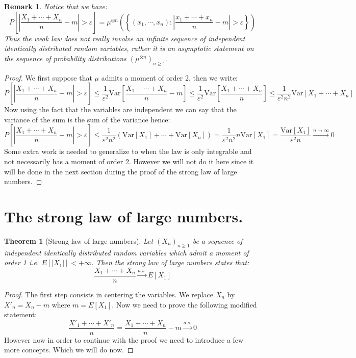 \documentclass[10pt,a4paper]{book}
\newtheorem{theorem}{Theorem}[section]
\newtheorem*{remark}{Remark}
\theoremstyle{definition}
\begin{document}
\begin{remark}
Notice that we have:
\[
P\left[ \left|\frac{X_1 + \cdots + X_n}{n} - m \right| > \varepsilon \right] = \mu^{\otimes n} \left( \left\{ \left( x_1, \cdots, x_n \right) : \left| \frac{x_1 + \cdots + x_n}{n} - m \right| > \varepsilon \right\} \right)
\]
Thus the weak law does not really involve an infinite sequence of independent identically distributed random variables, rather it is an asymptotic statement on the sequence of probability distributions $(\mu^{\otimes n})_{n \geq 1}$. 
\end{remark}

\begin{proof}

We first suppose that $\mu$ admits a moment of order 2, then we write:
\[
P\left[ \left|\frac{X_1 + \cdots + X_n}{n} - m \right| > \varepsilon \right] \leq \frac{1}{\varepsilon^2} \text{Var}\left[ \frac{X_1 + \cdots + X_n}{n} - m \right] \leq \frac{1}{\varepsilon^2} \text{Var}\left[ \frac{X_1 + \cdots + X_n}{n}\right] \leq \frac{1}{\varepsilon^2 n^2} \text{Var}\left[X_1 + \cdots + X_n \right]
\]
Now using the fact that the variables are independent we can say that the variance of the sum is the sum of the variance hence:
\[
P\left[ \left|\frac{X_1 + \cdots + X_n}{n} - m \right| > \varepsilon \right] \leq  \frac{1}{\varepsilon^2 n^2} (\text{Var}[X_1] + \cdots + \text{Var}[X_n]) = \frac{1}{\varepsilon^2 n^2} n \text{Var}[X_1] = \frac{\text{Var}[X_1]}{\varepsilon^2 n} \stackrel{n \to \infty}{\longrightarrow} 0
\]
Some extra work is needed to generalize to when the law is only integrable and not necessarily has a moment of order 2. However we will not do it here since it will be done in the next section during the proof of the strong law of large numbers.
\end{proof}

\section{The strong law of large numbers.}

\begin{theorem}[Strong law of large numbers]
Let $(X_n)_{n \geq 1}$ be a sequence of independent identically distributed random variables which admit a moment of order 1 i.e. $E[|X_1|] < +\infty$. Then the strong law of large numbers states that:
\[
\frac{X_1 + \cdots + X_n}{n} \stackrel{a.s.}{\longrightarrow} E[X_1]
\]
\end{theorem}

\begin{proof}

The first step consists in centering the variables. We replace $X_n$ by $X'_n = X_n - m$ where $m = E[X_1]$. Now we need to prove the following modified statement:
\[
\frac{X'_1 + \cdots + X'_n}{n} = \frac{X_1 + \cdots + X_n}{n} - m \stackrel{a.s.}{\longrightarrow} 0
\]
However now in order to continue with the proof we need to introduce a few more concepts. Which we will do now.
\end{proof}
\end{document}
